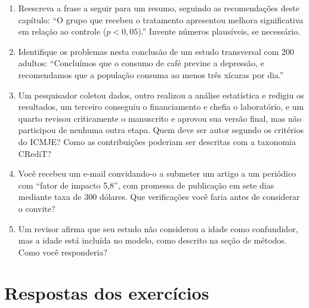 \documentclass[
]{book}
\begin{document}
\begin{enumerate}
\def\labelenumi{\arabic{enumi}.}
\item
  Reescreva a frase a seguir para um resumo, seguindo as recomendações deste capítulo: ``O grupo que recebeu o tratamento apresentou melhora significativa em relação ao controle (\(p < 0{,}05\)).'' Invente números plausíveis, se necessário.
\item
  Identifique os problemas nesta conclusão de um estudo transversal com 200 adultos: ``Concluímos que o consumo de café previne a depressão, e recomendamos que a população consuma ao menos três xícaras por dia.''
\item
  Um pesquisador coletou dados, outro realizou a análise estatística e redigiu os resultados, um terceiro conseguiu o financiamento e chefia o laboratório, e um quarto revisou criticamente o manuscrito e aprovou sua versão final, mas não participou de nenhuma outra etapa. Quem deve ser autor segundo os critérios do ICMJE? Como as contribuições poderiam ser descritas com a taxonomia CRediT?
\item
  Você recebeu um e-mail convidando-o a submeter um artigo a um periódico com ``fator de impacto 5,8'', com promessa de publicação em sete dias mediante taxa de 300 dólares. Que verificações você faria antes de considerar o convite?
\item
  Um revisor afirma que seu estudo não considerou a idade como confundidor, mas a idade está incluída no modelo, como descrito na seção de métodos. Como você responderia?
\end{enumerate}

\section{Respostas dos exercícios}\label{respostas-dos-exercuxedcios-6}
\end{document}
